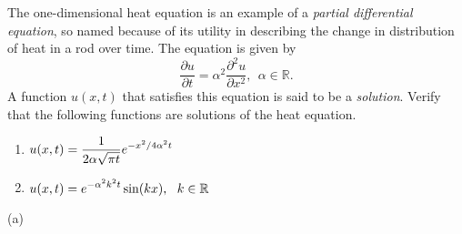 \documentclass[a4paper, 11pt]{report}
\begin{document}
{
	The one-dimensional heat equation is an example of a {\em partial differential equation}, so named because of its utility in describing the change in distribution of heat in a rod over time. The equation is given by
	$$
		\frac{\partial u}{\partial t} = \alpha^2 \frac{\partial^2u}{\partial x^2},\ \ \alpha\in\mathbb{R}.
	$$
	A function $u(x,t)$ that satisfies this equation is said to be a {\em solution}. Verify that the following functions are solutions of the heat equation.
	\begin{enumerate}[label=(\alph*)]
		\item $\displaystyle{u(x,t)=\frac{1}{2\alpha\sqrt{\pi t}} e^{-x^2/4\alpha^2t}}$
		\item $\displaystyle{u(x,t)= e^{-\alpha^2k^2t}\sin(kx),\ \ k\in\mathbb{R} }$
	\end{enumerate}
}
\sol (a)
\end{document}
